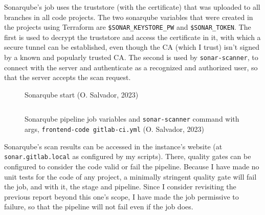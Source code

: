 \documentclass[11pt]{article}
\begin{document}
\begin{flushleft}
    \clearpage
    Sonarqube's job uses the truststore (with the certificate) that was uploaded to all branches in all code projects. The two sonarqube variables that were created in the projects using Terraform are \texttt{\$SONAR\_KEYSTORE\_PW} and \texttt{\$SONAR\_TOKEN}. The first is used to decrypt the truststore and access the certificate in it, with which a secure tunnel can be established, even though the CA (which I trust) isn't signed by a known and popularly trusted CA. The second is used by \texttt{sonar-scanner}, to connect with the server and authenticate as a recognized and authorized user, so that the server accepts the scan request.
    \linebreak

        \begin{figure}[htb]
            \centering
            \caption{Sonarqube start (O. Salvador, 2023)}
        \end{figure}

        \begin{figure}[htb]
            \centering
            \begin{subfigure}{.95\textwidth}
                \hspace{-5cm}
                \inputminted[fontsize=\scriptsize, firstline=1, lastline=2, linenos, frame=single, tabsize=1, breaklines]{bash}{../sonarqube-pipeline-commands.sh}
              \end{subfigure}
            \caption{Sonarqube pipeline job variables and \texttt{sonar-scanner} command with args, \texttt{frontend-code gitlab-ci.yml} (O. Salvador, 2023)}
        \end{figure}

    Sonarqube's scan results can be accessed in the instance's website (at \texttt{sonar.gitlab.local} as configured by my scripts). There, quality gates can be configured to consider the code valid or fail the pipeline. Because I have made no unit tests for the code of any project, a minimally stringent quality gate will fail the job, and with it, the stage and pipeline. Since I consider revisiting the previous report beyond this one's scope, I have made the job permissive to failure, so that the pipeline will not fail even if the job does.


\end{flushleft}
\end{document}
